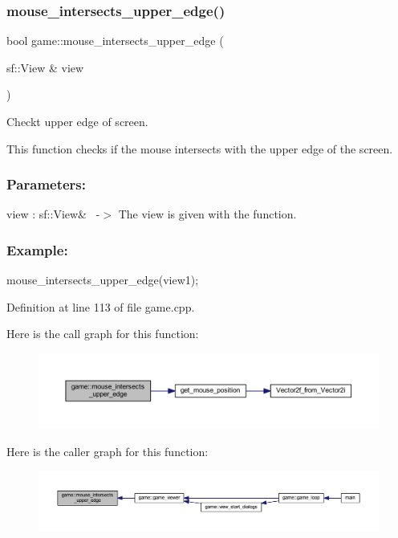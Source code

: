 \subsubsection{\texorpdfstring{mouse\+\_\+intersects\+\_\+upper\+\_\+edge()}{mouse\_intersects\_upper\_edge()}}
{\footnotesize\ttfamily bool game\+::mouse\+\_\+intersects\+\_\+upper\+\_\+edge (\begin{DoxyParamCaption}\item[{sf\+::\+View \&}]{view }\end{DoxyParamCaption})\hspace{0.3cm}{\ttfamily [private]}}



Checkt upper edge of screen. 

This function checks if the mouse intersects with the upper edge of the screen.~\newline
 \subsubsection*{Parameters\+: }

view \+: sf\+::\+View\&~\newline
-\/$>$ The view is given with the function.

\subsubsection*{Example\+: }

mouse\+\_\+intersects\+\_\+upper\+\_\+edge(view1); 

Definition at line 113 of file game.\+cpp.

Here is the call graph for this function\+:
\nopagebreak
\begin{figure}[H]
\begin{center}
\leavevmode
\includegraphics[width=350pt]{classgame_abb1c33c5a73de27e4ebd20e1b61dc3dc_cgraph}
\end{center}
\end{figure}
Here is the caller graph for this function\+:
\nopagebreak
\begin{figure}[H]
\begin{center}
\leavevmode
\includegraphics[width=350pt]{classgame_abb1c33c5a73de27e4ebd20e1b61dc3dc_icgraph}
\end{center}
\end{figure}
\mbox{\label{classgame_ab13015cdc535671de1dd7a5a7970a238}} 
